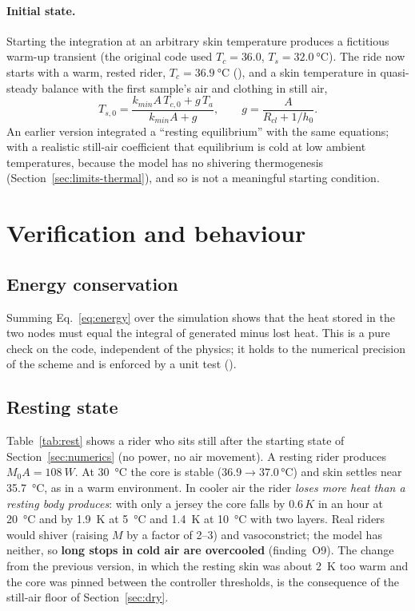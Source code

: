 \documentclass[11pt,a4paper]{article}
\newcommand{\code}[1]{\texttt{\detokenize{#1}}}
\begin{document}
\paragraph{Initial state.} Starting the integration at an arbitrary skin temperature produces a fictitious warm-up transient (the original code used \(T_c=36.0\), \(T_s=\SI{32.0}{\degreeCelsius}\)). The ride now starts with a warm, rested rider, \(T_c=\SI{36.9}{\degreeCelsius}\) (\code{CORE_START_C}), and a skin temperature in quasi-steady balance with the first sample's air and clothing in still air,
\begin{equation}
 T_{s,0}=\frac{k_{min}A\,T_{c,0}+g\,T_a}{k_{min}A+g},\qquad g=\frac{A}{R_{cl}+1/h_0}.
\end{equation}
An earlier version integrated a ``resting equilibrium'' with the same equations; with a realistic still-air coefficient that equilibrium is cold at low ambient temperatures, because the model has no shivering thermogenesis (Section~\ref{sec:limits-thermal}), and so is not a meaningful starting condition.

\section{Verification and behaviour}
\label{sec:thermal-verif}
\subsection{Energy conservation}
Summing Eq.~\eqref{eq:energy} over the simulation shows that the heat stored in the two nodes must equal the integral of generated minus lost heat. This is a pure check on the code, independent of the physics; it holds to the numerical precision of the scheme and is enforced by a unit test (\code{test_energy_is_conserved}).

\subsection{Resting state}
\label{sec:rest}
Table~\ref{tab:rest} shows a rider who sits still after the starting state of Section~\ref{sec:numerics} (no power, no air movement). A resting rider produces \(M_0A=\SI{108}{W}\). At \SI{30}{\degreeCelsius} the core is stable (\(36.9\to37.0\,\si{\degreeCelsius}\)) and skin settles near \SI{35.7}{\degreeCelsius}, as in a warm environment. In cooler air the rider \emph{loses more heat than a resting body produces}: with only a jersey the core falls by \(0.6\,\si{K}\) in an hour at \SI{20}{\degreeCelsius} and by \SI{1.9}{K} at \SI{5}{\degreeCelsius} and \SI{1.4}{K} at \SI{10}{\degreeCelsius} with two layers. Real riders would shiver (raising \(M\) by a factor of 2--3) and vasoconstrict; the model has neither, so \textbf{long stops in cold air are overcooled} (finding~O9). The change from the previous version, in which the resting skin was about \SI{2}{K} too warm and the core was pinned between the controller thresholds, is the consequence of the still-air floor of Section~\ref{sec:dry}.
\end{document}
